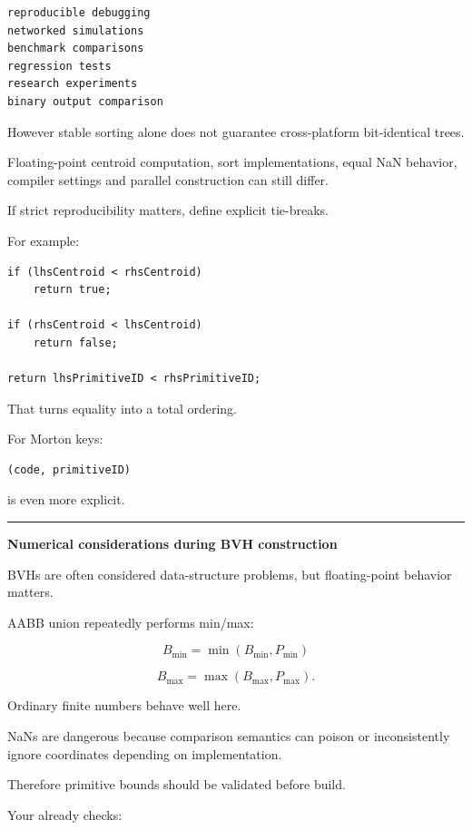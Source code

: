 \begin{verbatim}
reproducible debugging
networked simulations
benchmark comparisons
regression tests
research experiments
binary output comparison
\end{verbatim}

However stable sorting alone does not guarantee cross-platform bit-identical trees.

Floating-point centroid computation, sort implementations, equal NaN behavior, compiler settings and parallel construction can still differ.

If strict reproducibility matters, define explicit tie-breaks.

For example:

\begin{verbatim}
if (lhsCentroid < rhsCentroid)
    return true;

if (rhsCentroid < lhsCentroid)
    return false;

return lhsPrimitiveID < rhsPrimitiveID;
\end{verbatim}

That turns equality into a total ordering.

For Morton keys:

\begin{verbatim}
(code, primitiveID)
\end{verbatim}

is even more explicit.

\begin{center}\rule{0.5\linewidth}{0.5pt}\end{center}

\textbf{Numerical considerations during BVH construction}

BVHs are often considered data-structure problems, but floating-point behavior matters.

AABB union repeatedly performs min/max:

\[
B_{\min}=\min(B_{\min},P_{\min})
\]

\[
B_{\max}=\max(B_{\max},P_{\max}).
\]

Ordinary finite numbers behave well here.

NaNs are dangerous because comparison semantics can poison or inconsistently ignore coordinates depending on implementation.

Therefore primitive bounds should be validated before build.

Your  already checks:


